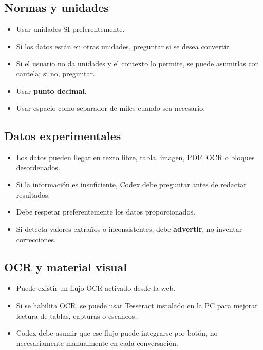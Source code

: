 \documentclass[12pt,a4paper]{article}
\begin{document}
\subsection{Normas y unidades}
\begin{itemize}
  \item Usar unidades SI preferentemente.
  \item Si los datos est\'an en otras unidades, preguntar si se desea convertir.
  \item Si el usuario no da unidades y el contexto lo permite, se puede asumirlas con cautela; si no, preguntar.
  \item Usar \textbf{punto decimal}.
  \item Usar espacio como separador de miles cuando sea necesario.
\end{itemize}

\subsection{Datos experimentales}
\begin{itemize}
  \item Los datos pueden llegar en texto libre, tabla, imagen, PDF, OCR o bloques desordenados.
  \item Si la informaci\'on es insuficiente, Codex debe preguntar antes de redactar resultados.
  \item Debe respetar preferentemente los datos proporcionados.
  \item Si detecta valores extra\~nos o inconsistentes, debe \textbf{advertir}, no inventar correcciones.
\end{itemize}

\subsection{OCR y material visual}
\begin{itemize}
  \item Puede existir un flujo OCR activado desde la web.
  \item Si se habilita OCR, se puede usar Tesseract instalado en la PC para mejorar lectura de tablas, capturas o escaneos.
  \item Codex debe asumir que ese flujo puede integrarse por bot\'on, no necesariamente manualmente en cada conversaci\'on.
\end{itemize}
\end{document}
